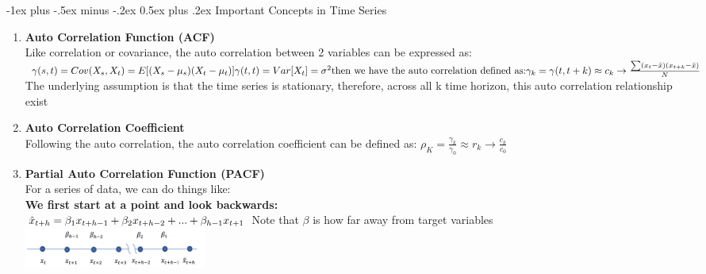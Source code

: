 \documentclass[10pt,landscape]{article}
\makeatletter
\renewcommand{\section}{\@startsection{section}{1}{0mm}%
                                {-1ex plus -.5ex minus -.2ex}%
                                {0.5ex plus .2ex}%
                                {\normalfont\large\bfseries}}
\makeatother
\begin{document}
\newpage
\begin{multicols}{3}
\setlength{\premulticols}{1pt}
\setlength{\postmulticols}{1pt}
\setlength{\multicolsep}{1pt}
\setlength{\columnsep}{2pt}



\section{Important Concepts in Time Series}
\begin{enumerate}
  \item \textbf{Auto Correlation Function (ACF)}\\
  		Like correlation or covariance, the auto correlation between 2 variables can be expressed as:\\
  		$
  		\gamma(s,t) = Cov(X_s, X_t) = E[(X_s - \mu_s)(X_t-\mu_t)]\\
  		\gamma(t,t) = Var[X_t] = \sigma^2\\
  		\text{then we have the auto correlation defined as:}\\
  		\gamma_k = \gamma(t, t+k) \approx c_k \rightarrow \frac{\sum(x_t - \bar x)(x_{t+k}-\bar x)}{N} \\
  		\text{}
  		$The underlying assumption is that the time series is stationary, therefore, across all k time horizon, this auto correlation relationship exist
  \item \textbf{Auto Correlation Coefficient}\\
  		Following the auto correlation, the auto correlation coefficient can be defined as:
  		$
  		\rho_K = \frac{\gamma_k}{\gamma_0} \approx r_k \rightarrow \frac{c_k}{c_0}
  		$
  		
  \item \textbf{Partial Auto Correlation Function (PACF)}\\
  		For a series of data, we can do things like:\\
  		\textbf{We first start at a point and look backwards:}\\
  		$
  		\hat x_{t+h} = \beta_1 x_{t+h-1} + \beta_2 x_{t+h-2} + ... + \beta_{h-1} x_{t+1}\\
  		$
  		Note that  $\beta$  is how far away from target variables\\
  		\includegraphics[width=60mm,scale=1]{images/PACF-1.png}
  		

\end{enumerate}
\end{multicols}
\end{document}
